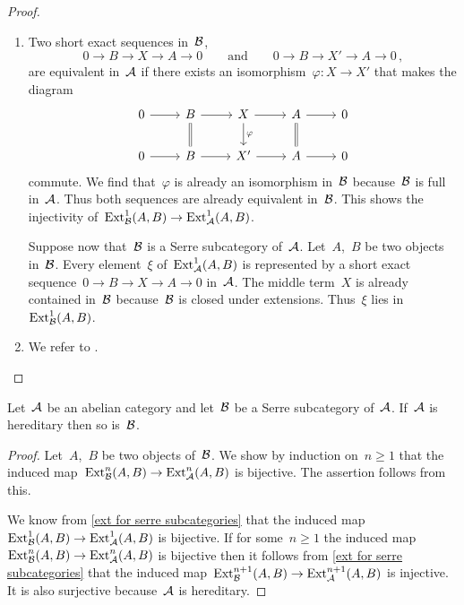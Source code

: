 \documentclass[a4paper,11pt]{scrartcl}
\begin{document}
\begin{proof}
  \leavevmode
  \begin{enumerate}
    \item
      Two short exact sequences in~$\mathcal{B}$,
      \[
        0 \to B \to X \to A \to 0
        \qquad\text{and}\qquad
        0 \to B \to X' \to A \to 0 \,,
      \]
      are equivalent in~$\mathcal{A}$ if there exists an isomorphism~$\varphi \colon X \to X'$ that makes the diagram
      \[
        \begin{tikzcd}
            0
            \arrow{r}
          &
            B
            \arrow{r}
            \arrow[equal]{d}
          &
            X
            \arrow{r}
            \arrow{d}[right]{\varphi}
          &
            A
            \arrow{r}
            \arrow[equal]{d}
          &
            0
          \\
            0
            \arrow{r}
          &
            B
            \arrow{r}
          &
            X'
            \arrow{r}
          &
            A
            \arrow{r}
          &
            0
        \end{tikzcd}
      \]
      commute.
      We find that~$\varphi$ is already an isomorphism in~$\mathcal{B}$ because~$\mathcal{B}$ is full in~$\mathcal{A}$.
      Thus both sequences are already equivalent in~$\mathcal{B}$.
      This shows the injectivity of~$\operatorname{Ext}^1_{\mathcal{B}}(A,B) \to \operatorname{Ext}^1_{\mathcal{A}}(A,B)$.

      Suppose now that~$\mathcal{B}$ is a Serre subcategory of~$\mathcal{A}$.
      Let~$A$,~$B$ be two objects in~$\mathcal{B}$.
      Every element~$\xi$ of~$\operatorname{Ext}^1_{\mathcal{A}}(A,B)$ is represented by a short exact sequence~$0 \to B \to X \to A \to 0$ in~$\mathcal{A}$.
      The middle term~$X$ is already contained in~$\mathcal{B}$ because~$\mathcal{B}$ is closed under extensions.
      Thus~$\xi$ lies in~$\operatorname{Ext}^1_{\mathcal{B}}(A,B)$.
    \item
      We refer to \cite[Proposition~3.3]{yoneda_ext}.
    \qedhere
  \end{enumerate}
\end{proof}

\begin{corollary}
  \label{serre subcategories are again hereditary}
  Let~$\mathcal{A}$ be an abelian category and let~$\mathcal{B}$ be a Serre subcategory of~$\mathcal{A}$.
  If~$\mathcal{A}$ is hereditary then so is~$\mathcal{B}$.
\end{corollary}

\begin{proof}
  Let~$A$,~$B$ be two objects of~$\mathcal{B}$.
  We show by induction on~$n \geq 1$ that the induced map~$\operatorname{Ext}^n_{\mathcal{B}}(A,B) \to \operatorname{Ext}^n_{\mathcal{A}}(A,B)$ is bijective.
  The assertion follows from this.

  We know from \cref{ext for serre subcategories} that the induced map~$\operatorname{Ext}^1_{\mathcal{B}}(A,B) \to \operatorname{Ext}^1_{\mathcal{A}}(A,B)$ is bijective.
  If for some~$n \geq 1$ the induced map~$\operatorname{Ext}^n_{\mathcal{B}}(A,B) \to \operatorname{Ext}^n_{\mathcal{A}}(A,B)$ is bijective then it follows from \cref{ext for serre subcategories} that the induced map~$\operatorname{Ext}^{n+1}_{\mathcal{B}}(A,B) \to \operatorname{Ext}^{n+1}_{\mathcal{A}}(A,B)$ is injective.
  It is also surjective because~$\mathcal{A}$ is hereditary.
\end{proof}
\end{document}
